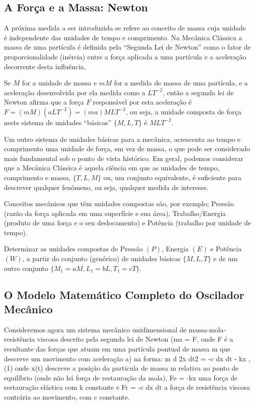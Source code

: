 \subsection{A Força e a Massa: Newton}

A próxima medida a ser introduzida se refere ao conceito de massa cuja unidade é independente das unidades de tempo e comprimento. Na Mecânica Clássica a massa de uma partícula é definida pela “Segunda Lei de Newton” como o fator de proporcionalidade (inércia) entre a força aplicada a uma partícula e a aceleração decorrente desta influência.

Se \(M\) for a unidade de massa e \(m M\) for a medida de massa de uma partícula, e a aceleração desenvolvida por ela medida como a \(LT^{-2}\), então a segunda lei de Newton afirma que a força \(F\) responsável por esta aceleração é \(F = (m M)(a LT^{-2}) = (m a) MLT^{-2}\), ou seja, a unidade composta de força neste sistema de unidades ``básicas'' \(\{M, L, T\}\) é \(MLT^{-2}\).


Um outro sistema de unidades básicas para a mecânica, acrescenta ao tempo e comprimento uma unidade de força, em vez de massa, o que pode ser considerado mais fundamental sob o ponto de vista histórico. Em geral, podemos considerar que a Mecânica Clássica é aquela ciência em que as unidades de tempo, comprimento e massa, \(\{T, L, M\}\) ou, um conjunto equivalente, é suficiente para descrever qualquer fenômeno, ou seja, qualquer medida de interesse.

Conceitos mecânicos que têm unidades compostas são, por exemplo; Pressão (razão da força aplicada em uma superfície e sua área), Trabalho/Energia (produto de uma força e o seu deslocamento) e Potência (trabalho por unidade de tempo).

\begin{exercise}
Determinar as unidades compostas de Pressão \((P)\), Energia \((E)\) e Potência \((W)\), a partir do conjunto (genérico) de unidades básicas \(\{M, L, T\}\) e de um outro conjunto \(\{M_1 = a M, L_1 = b L, T_1 = c T\}\).
\end{exercise}

\subsection{O Modelo Matemático Completo do Oscilador Mecânico}

Consideremos agora um sistema mecânico unidimensional de massa-mola-resistência viscosa descrito pela segunda lei de Newton (ma = F, onde F é a resultante das forças que atuam em uma partícula pontual de massa m que descreve um movimento com aceleração a) na forma:
m d 2x dt2 = -c dx dt - kx , (1)
onde x(t) descreve a posição da partícula de massa m relativa ao ponto de equilíbrio (onde não há força de restauração da mola), Fe = -kx uma força de restauração elástica com k  constante e Fr = -c
dx dt a força de resistência viscosa contrária ao movimento, com c  constante.

